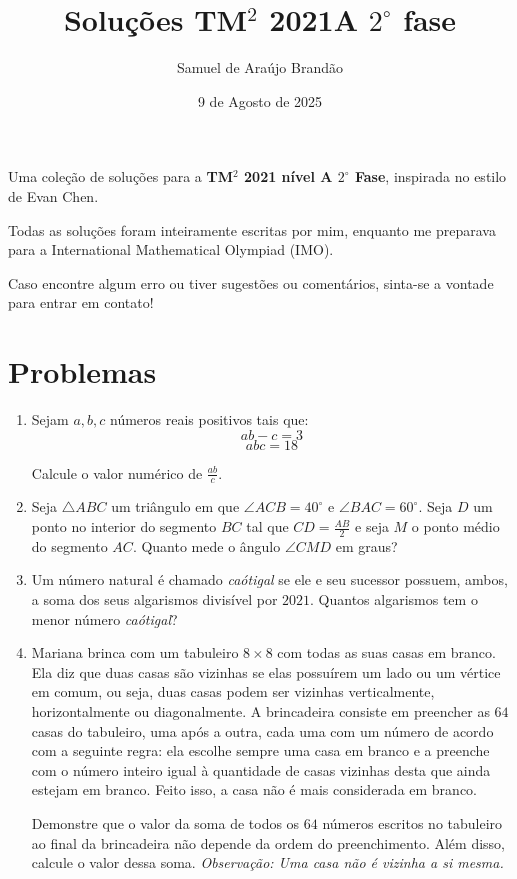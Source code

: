 \documentclass[12pt]{article}
\title{\sffamily\bfseries{Soluções TM$^2$ 2021A $2^{\circ}$ fase}}
\author{Samuel de Araújo Brandão}
\date{9 de Agosto de 2025}
\begin{document}
  \maketitle

  Uma coleção de soluções para a \textbf{TM$^2$ 2021 nível A $2^{\circ}$ Fase}, inspirada no estilo de Evan Chen.

  Todas as soluções foram inteiramente escritas por mim, enquanto me preparava para a
  International Mathematical Olympiad (IMO).

  Caso encontre algum erro ou tiver sugestões ou comentários, sinta-se a vontade 
  para entrar em contato!

  \tableofcontents
  
  \clearpage
  
  \section{\textsf{Problemas}}
  \begin{enumerate}[label=\textbf{\arabic*.}]
      \item Sejam $a, b, c$ números reais positivos tais que:
        \[
          ab - c = 3
        \]
        \[
          abc = 18
        \]

        Calcule o valor numérico de $\frac{ab}{c}$.

        \item Seja $\triangle ABC$ um triângulo em que $\angle ACB = 40^\circ$ e $\angle
          BAC = 60^\circ$. Seja $D$ um ponto no interior do segmento $BC$ tal que $CD
          = \frac{AB}{2}$ e seja $M$ o ponto médio do segmento $AC$. Quanto mede o ângulo
          $\angle CMD$ em graus?

        \item Um número natural é chamado \textit{caótigal} se ele e seu sucessor possuem,
          ambos, a soma dos seus algarismos divisível por $2021$. Quantos algarismos tem
          o menor número \textit{caótigal}?
          
        \item Mariana brinca com um tabuleiro $8 \times 8$ com todas as suas casas em branco. Ela diz que duas casas são vizinhas se elas possuírem um lado ou um vértice em comum, ou seja, duas casas podem ser vizinhas verticalmente, horizontalmente ou diagonalmente. A brincadeira consiste em preencher as $64$ casas do tabuleiro, uma após a outra, cada uma com um número de acordo com a seguinte regra: ela escolhe sempre uma casa em branco e a preenche com o número inteiro igual à quantidade de casas
          vizinhas desta que ainda estejam em branco. Feito isso, a casa não é mais 
          considerada em branco.

          Demonstre que o valor da soma de todos os $64$ números escritos no tabuleiro
          ao final da brincadeira não depende da ordem do preenchimento. Além disso,
          calcule o valor dessa soma.
          \textit{Observação: Uma casa não é vizinha a si mesma.}

    \end{enumerate}
\end{document}
